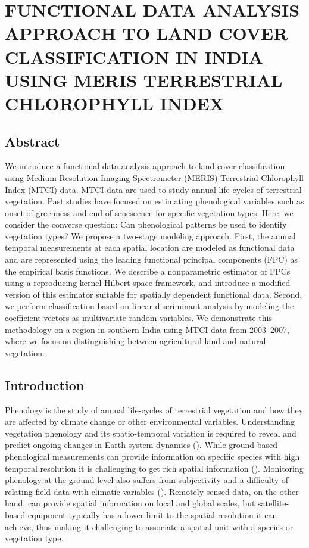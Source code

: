 

\chapter{FUNCTIONAL DATA ANALYSIS APPROACH TO LAND COVER CLASSIFICATION IN INDIA USING MERIS TERRESTRIAL CHLOROPHYLL INDEX} \label{phenology}

\section{Abstract}

We introduce a functional data analysis approach to land cover classification using Medium Resolution Imaging Spectrometer (MERIS) Terrestrial Chlorophyll Index (MTCI) data. MTCI data are used to study annual life-cycles of terrestrial vegetation. Past studies have focused on estimating phenological variables such as onset of greenness and end of senescence for specific vegetation types. Here, we consider the converse question: Can phenological patterns be used to identify vegetation types? We propose a two-stage modeling approach. First, the annual temporal measurements at each spatial location are modeled as functional data and are represented using the leading functional principal components (FPC) as the empirical basis functions. We describe a nonparametric estimator of FPCs using a reproducing kernel Hilbert space framework, and introduce a modified version of this estimator suitable for spatially dependent functional data. Second, we perform classification based on linear discriminant analysis by modeling the coefficient vectors as multivariate random variables. We demonstrate this methodology on a region in southern India using MTCI data from 2003--2007, where we focus on distinguishing between agricultural land and natural vegetation.

\section{Introduction}

Phenology is the study of annual life-cycles of terrestrial vegetation and how they are affected by climate change or other environmental variables. Understanding vegetation phenology and its spatio-temporal variation is required to reveal and predict ongoing changes in Earth system dynamics (\cite{Jeganathan:2010gqa}). While ground-based phenological measurements can provide information on specific species with high temporal resolution it is challenging to get rich spatial information (\cite{Studer:2007hd}). Monitoring phenology at the ground level also suffers from subjectivity and a difficulty of relating field data with climatic variables (\cite{Jeganathan:2010gqa}). Remotely sensed data, on the other hand, can provide spatial information on local and global scales, but satellite-based equipment typically has a lower limit to the spatial resolution it can achieve, thus making it challenging to associate a spatial unit with a species or vegetation type. 

